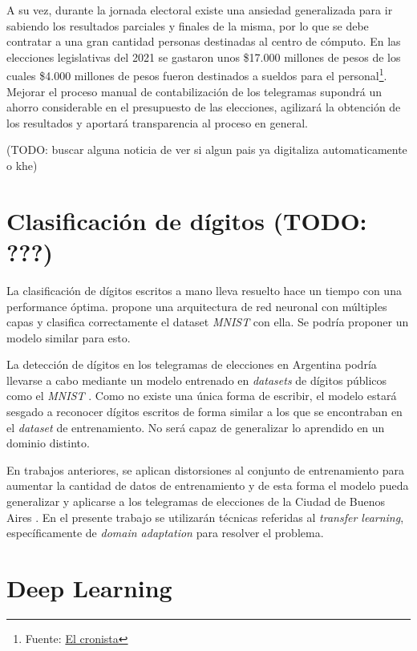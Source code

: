 A su vez, durante la jornada electoral existe una ansiedad generalizada para ir sabiendo los resultados parciales y
finales de la misma, por lo que se debe contratar a una gran cantidad personas destinadas al centro de c\'omputo. En
las elecciones legislativas del 2021 se gastaron unos \$17.000 millones de pesos de los cuales \$4.000 millones de
pesos fueron destinados a sueldos para el personal\footnote{Fuente:
    \href{https://www.cronista.com/economia-politica/Elecciones-legislativas-2021-cuanto-mas-se-gastara-por-el-coronavirus-segun-el-Presupuesto-20201004-0006.html}{El
        cronista}}. Mejorar el proceso manual de contabilizaci\'on de los telegramas supondr\'a un ahorro considerable en el
presupuesto de las elecciones, agilizar\'a la obtenci\'on de los resultados y aportar\'a transparencia al proceso en
general.

(TODO: buscar alguna noticia de ver si algun pais ya digitaliza automaticamente o khe)

\section{Clasificaci\'on de d\'igitos (TODO: ???)}

La clasificaci\'on de d\'igitos escritos a mano lleva resuelto hace un tiempo con una performance \'optima.
\cite{lecun1998gradient} propone una arquitectura de red neuronal con m\'ultiples capas y clasifica correctamente el
dataset {\it MNIST} con ella. Se podr\'ia proponer un modelo similar para esto.

La detecci\'on de d\'igitos en los telegramas de elecciones en Argentina podr\'ia llevarse a cabo mediante un modelo
entrenado en {\it datasets} de d\'igitos p\'ublicos como el {\it MNIST} \cite{lecun1998gradient}. Como no existe una
\'unica forma de escribir, el modelo estar\'a sesgado a reconocer d\'igitos escritos de forma similar a los que se
encontraban en el {\it dataset} de entrenamiento. No ser\'a capaz de generalizar lo aprendido en un dominio distinto.

En trabajos anteriores, se aplican distorsiones al conjunto de entrenamiento para aumentar la cantidad de datos de
entrenamiento y de esta forma el modelo pueda generalizar y aplicarse a los telegramas de elecciones de la Ciudad de
Buenos Aires \cite{lamagna2016lectura}. En el presente trabajo se utilizar\'an t\'ecnicas referidas al {\it transfer
        learning}, espec\'ificamente de {\it domain adaptation} para resolver el problema.

\section{Deep Learning}

